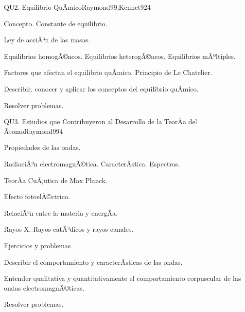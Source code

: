 \begin{syllabus}
\begin{unit}{QU2. Equilibrio QuÃ­mico}{Raymond99,Kennet92}{4}
\begin{topics}
      \item Concepto. Constante de equilibrio.
      \item Ley de acciÃ³n de las masas.
      \item Equilibrios homogÃ©neos. Equilibrios heterogÃ©neos. Equilibrios mÃºltiples.
      \item Factores que afectan el equilibrio quÃ­mico. Principio de Le Chatelier.
    \end{topics}
   \begin{unitgoals}
      \item Describir, conocer y aplicar los conceptos del equilibrio quÃ­mico.
      \item Resolver problemas.
   \end{unitgoals}
\end{unit}

\begin{unit}{QU3. Estudios que Contribuyeron al Desarrollo de la TeorÃ­a del Ãtomo}{Raymond99}{4}
\begin{topics}
      \item Propiedades de las ondas.
      \item RadiaciÃ³n electromagnÃ©tica. CaracterÃ­stica. Espectros.
      \item TeorÃ­a CuÃ¡ntica de Max Planck.
      \item Efecto fotoelÃ©ctrico.
      \item RelaciÃ³n entre la materia y energÃ­a.
      \item Rayos X, Rayos catÃ³dicos y rayos canales.
      \item Ejercicios y problemas
\end{topics}

   \begin{unitgoals}
      \item Describir el comportamiento y caracterÃ­sticas de las ondas.
      \item Entender qualitativa y quantitativamente el comportamiento corpuscular de las ondas electromagnÃ©ticas.
      \item Resolver problemas.
   \end{unitgoals}
\end{unit}


\end{syllabus}
